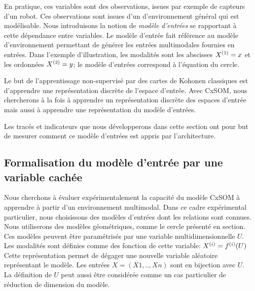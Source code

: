 En pratique, ces variables sont des observations, issues par exemple de capteurs d'un robot. Ces observations sont issues d'un d'environnement général qui est modélisable. 
Nous introduisons la notion de \emph{modèle d'entrées} se rapportant à cette dépendance entre variables.
Le modèle d'entrée fait référence au modèle d'environnement permettant de générer les entrées multimodales fournies en entrées. Dans l'exemple d'illustration, les modalités sont les abscisses $X^{({1})} = x$ et les ordonnées $X^{({2})} = y$; le modèle d'entrées correspond à l'équation du cercle.

Le but de l'apprentissage non-supervisé par des cartes de Kohonen classiques est d'apprendre une représentation discrète de l'espace d'entrée.
Avec CxSOM, nous chercherons à la fois à apprendre un représentation discrète des espaces d'entrée mais aussi à apprendre une représentation du modèle d'entrées.

Les tracés et indicateurs que nous développerons dans cette section ont pour but de mesurer comment ce modèle d'entrées est appris par l'architecture. 

\subsection{Formalisation du modèle d'entrée par une variable cachée}

Nous cherchons à évaluer expérimentalement la capacité du modèle CxSOM à apprendre à partir d'un environnement multimodal. Dans ce cadre expérimental particulier, nous choisissons des modèles d'entrées dont les relations sont connues. 
Nous utiliserons des modèles géométriques, comme le cercle présenté en section. Ces modèles peuvent être paramétrisés par une variable multidimensionnelle $U$. Les modalités sont définies comme des fonction de cette variable:
$X^{({i})} = f^{({i})}(U)$
Cette représentation permet de dégager une nouvelle variable aléatoire représentant le modèle. Les entrées $X = (X1,..,Xn)$ sont en bijection avec $U$.
La définition de $U$ peut aussi être considérée comme un cas particulier de réduction de dimension du modèle.

